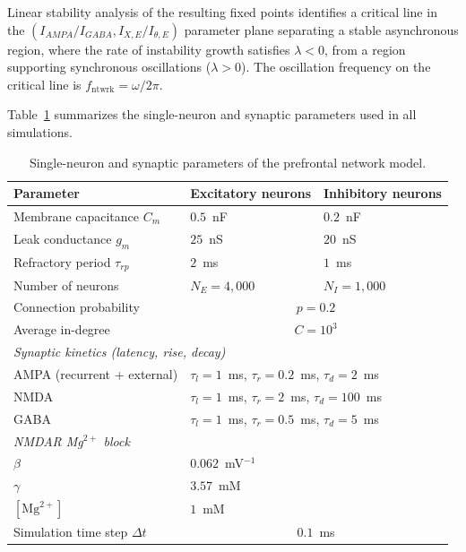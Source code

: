 \documentclass[11pt]{article}
\begin{document}
Linear stability analysis of the resulting fixed points identifies a critical line in the $(I_{AMPA}/I_{GABA}, I_{X,E}/I_{\theta,E})$ parameter plane separating a stable asynchronous region, where the rate of instability growth satisfies $\lambda < 0$, from a region supporting synchronous oscillations ($\lambda > 0$). The oscillation frequency on the critical line is $f_{\mathrm{ntwrk}} = \omega/2\pi$.

Table~\ref{tab:params} summarizes the single-neuron and synaptic parameters used in all simulations.

\begin{table}[ht]
\centering
\caption{Single-neuron and synaptic parameters of the prefrontal network model.}
\label{tab:params}
\begin{tabular}{lll}
\toprule
Parameter & Excitatory neurons & Inhibitory neurons \\
\midrule
Membrane capacitance $C_m$ & $0.5$~nF & $0.2$~nF \\
Leak conductance $g_m$ & $25$~nS & $20$~nS \\
Refractory period $\tau_{rp}$ & $2$~ms & $1$~ms \\
Number of neurons & $N_E = 4{,}000$ & $N_I = 1{,}000$ \\
Connection probability & \multicolumn{2}{c}{$p = 0.2$} \\
Average in-degree & \multicolumn{2}{c}{$C = 10^3$} \\
\midrule
\multicolumn{3}{l}{\emph{Synaptic kinetics (latency, rise, decay)}} \\
AMPA (recurrent + external) & \multicolumn{2}{l}{$\tau_l = 1$~ms, $\tau_r = 0.2$~ms, $\tau_d = 2$~ms} \\
NMDA & \multicolumn{2}{l}{$\tau_l = 1$~ms, $\tau_r = 2$~ms, $\tau_d = 100$~ms} \\
GABA & \multicolumn{2}{l}{$\tau_l = 1$~ms, $\tau_r = 0.5$~ms, $\tau_d = 5$~ms} \\
\midrule
\multicolumn{3}{l}{\emph{NMDAR Mg$^{2+}$ block}} \\
$\beta$ & \multicolumn{2}{l}{$0.062$~mV$^{-1}$} \\
$\gamma$ & \multicolumn{2}{l}{$3.57$~mM} \\
$[\text{Mg}^{2+}]$ & \multicolumn{2}{l}{$1$~mM} \\
\midrule
Simulation time step $\Delta t$ & \multicolumn{2}{c}{$0.1$~ms} \\
\bottomrule
\end{tabular}
\end{table}
\end{document}
